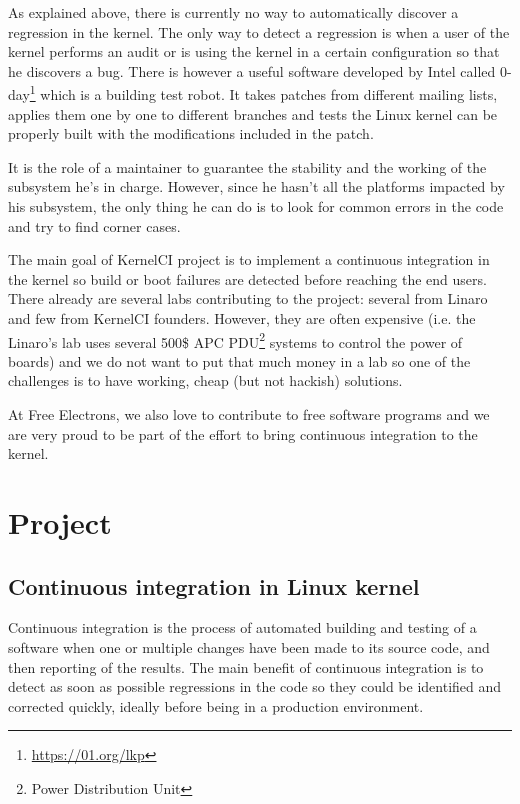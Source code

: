 As explained above, there is currently no way to automatically discover a regression in the kernel. The only way to detect a regression is when a user of the kernel performs an audit or is using the kernel in a certain configuration so that he discovers a bug. There is however a useful software developed by Intel called 0-day\footnote{\url{https://01.org/lkp}} which is a building test robot. It takes patches from different mailing lists, applies them one by one to different branches and tests the Linux kernel can be properly built with the modifications included in the patch.

It is the role of a maintainer to guarantee the stability and the working of the subsystem he's in charge. However, since he hasn't all the platforms impacted by his subsystem, the only thing he can do is to look for common errors in the code and try to find corner cases.

The main goal of KernelCI project is to implement a continuous integration in the kernel so build or boot failures are detected before reaching the end users. There already are several labs contributing to the project: several from Linaro and few from KernelCI founders. However, they are often expensive (i.e. the Linaro's lab uses several 500\$ APC PDU\footnote{Power Distribution Unit} systems to control the power of boards) and we do not want to put that much money in a lab so one of the challenges is to have working, cheap (but not hackish) solutions.

At Free Electrons, we also love to contribute to free software programs and we are very proud to be part of the effort to bring continuous integration to the kernel.

\section{Project}
\subsection{Continuous integration in Linux kernel}

Continuous integration is the process of automated building and testing of a software when one or multiple changes have been made to its source code, and then reporting of the results. The main benefit of continuous integration is to detect as soon as possible regressions in the code so they could be identified and corrected quickly, ideally before being in a production environment.

